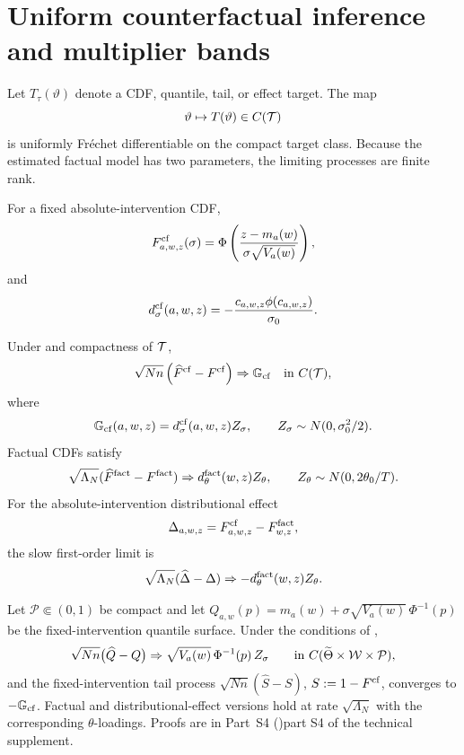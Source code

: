 \section{Uniform counterfactual inference and multiplier bands}\label{sec:uniform}

Let $T_\tau(\vartheta)$ denote a CDF, quantile, tail, or effect target. The map
\[
 \vartheta\mapsto T(\vartheta)\in C(\mathcal T)
\]
is uniformly Fr\'echet differentiable on the compact target class. Because the estimated factual model has two parameters, the limiting processes are finite rank.

For a fixed absolute-intervention CDF,
\[
 F_{a,w,z}^{\mathrm{cf}}(\sigma)
 =\Phi\left(\frac{z-m_a(w)}{\sigma\sqrt{V_a(w)}}\right),
\]
and
\[
 d_\sigma^{\mathrm{cf}}(a,w,z)
 =-\frac{c_{a,w,z}\phi(c_{a,w,z})}{\sigma_0}.
\]

\begin{theorem}\label{thm:processes}
Under  and compactness of $\mathcal T$,
\[
 \sqrt{Nn}\left(\widehat F^{\mathrm{cf}}-F^{\mathrm{cf}}\right)
 \Rightarrow
 \mathbb G_{\mathrm{cf}}
 \quad\text{in }C(\mathcal T),
\]
where
\[
 \mathbb G_{\mathrm{cf}}(a,w,z)=d_\sigma^{\mathrm{cf}}(a,w,z)Z_\sigma,
 \qquad
 Z_\sigma\sim N(0,\sigma_0^2/2).
\]
Factual CDFs satisfy
\[
 \sqrt{\Lambda_N}(\widehat F^{\mathrm{fact}}-F^{\mathrm{fact}})
 \Rightarrow d_\theta^{\mathrm{fact}}(w,z)Z_\theta,
 \qquad
 Z_\theta\sim N(0,2\theta_0/T).
\]
For the absolute-intervention distributional effect
\[
 \Delta_{a,w,z}=F_{a,w,z}^{\mathrm{cf}}-F_{w,z}^{\mathrm{fact}},
\]
the slow first-order limit is
\[
 \sqrt{\Lambda_N}(\widehat\Delta-\Delta)
 \Rightarrow-d_\theta^{\mathrm{fact}}(w,z)Z_\theta.
\]
\end{theorem}

\begin{theorem}\label{thm:quantile-tail}
Let $\mathcal P\Subset(0,1)$ be compact and let
$Q_{a,w}(p)=m_a(w)+\sigma\sqrt{V_a(w)}\,\Phi^{-1}(p)$ be the
fixed-intervention quantile surface. Under the conditions of
,
\[
 \sqrt{Nn}\big(\widehat Q-Q\big)
 \Rightarrow\sqrt{V_a(w)}\,\Phi^{-1}(p)\,Z_\sigma
 \qquad\text{in }C(\widetilde\Theta\times\mathcal W\times\mathcal P),
\]
and the fixed-intervention tail process
$\sqrt{Nn}(\widehat S-S)$, $S:=1-F^{\mathrm{cf}}$, converges to
$-\mathbb G_{\mathrm{cf}}$. Factual and distributional-effect versions hold at rate
$\sqrt{\Lambda_N}$ with the corresponding $\theta$-loadings. Proofs are in
\ifdefined\MERGEDDOC Part~S4 ()\else part S4 of the technical supplement\fi.
\end{theorem}

